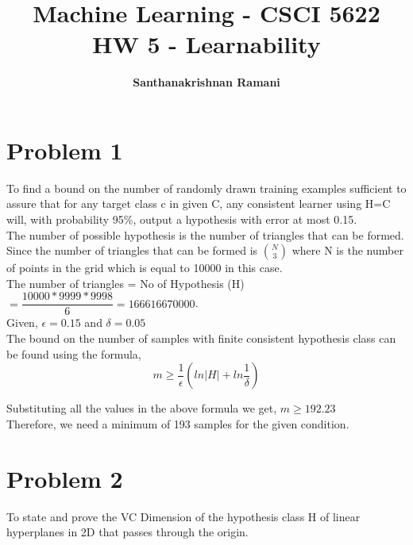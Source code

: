 \documentclass{article}
\date{\displaydate{date}}
\title{\textbf{Machine Learning - CSCI 5622} \\
HW 5 - Learnability}
\author{\textbf{Santhanakrishnan Ramani}}
\begin{document}
\maketitle

\section*{Problem 1}
To find a bound on the number of randomly drawn training examples sufficient to assure that for any target class c in given C, any consistent learner using H=C will, with probability 95\%, output a hypothesis with error at most 0.15.\\

The number of possible hypothesis is the number of triangles that can be formed. Since the number of triangles that can be formed is $\binom{N}{3}$ where N is the number of points in the grid which is equal to 10000 in this case.\\

The number of triangles = No of Hypothesis (H) $ = \dfrac{10000 * 9999 * 9998}{6} = 166616670000$.\\

Given,  $\epsilon = 0.15$ and  $\delta = 0.05$\\

The bound on the number of samples with finite consistent hypothesis class can be found using the formula,
$$m \geq \dfrac{1}{\epsilon}(ln|H| + ln \dfrac{1}{\delta})$$

Substituting all the values in the above formula we get, $m \geq 192.23$\\

Therefore, we need a minimum of 193 samples for the given condition.

\section*{Problem 2}
To state and prove the VC Dimension of the hypothesis class H of linear hyperplanes in 2D that passes through the origin.
\end{document}
